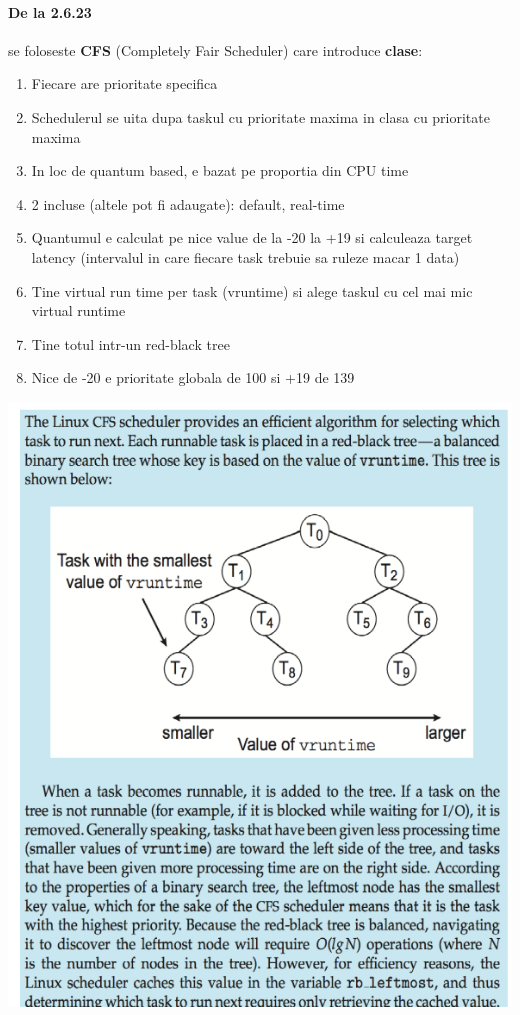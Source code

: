 \documentclass{article}
\begin{document}
\paragraph*{De la 2.6.23} se foloseste \textbf{CFS} (Completely Fair Scheduler) care introduce \textbf{clase}:
\begin{enumerate}
    \item Fiecare are prioritate specifica
    \item Schedulerul se uita dupa taskul cu prioritate maxima in clasa cu prioritate maxima
    \item In loc de quantum based, e bazat pe proportia din CPU time
    \item 2 incluse (altele pot fi adaugate): default, real-time
    \item Quantumul e calculat pe nice value de la -20 la +19 si calculeaza target latency (intervalul in care fiecare task trebuie sa ruleze macar 1 data)
    \item Tine virtual run time per task (vruntime) si alege taskul cu cel mai mic virtual runtime
    \item Tine totul intr-un red-black tree
    \item Nice de -20 e prioritate globala de 100 si +19 de 139
\end{enumerate}

\begin{center}
    \includegraphics[scale=0.4]{13_cfs.png}
\end{center}
\end{document}
